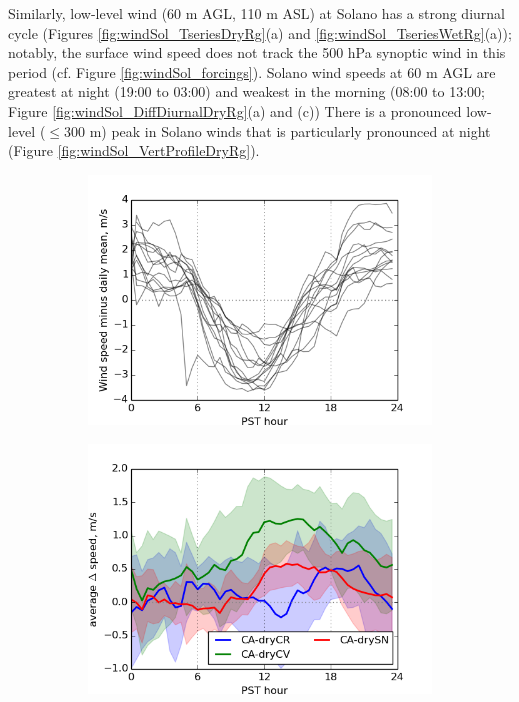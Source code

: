 Similarly, low-level wind (60 m AGL, 110 m ASL) at Solano has a strong diurnal cycle (Figures \ref{fig:windSol_TseriesDryRg}(a) and \ref{fig:windSol_TseriesWetRg}(a)); notably, the surface wind speed does not track the 500 hPa synoptic wind in this period (cf. Figure \ref{fig:windSol_forcings}).  Solano wind speeds at 60 m AGL are greatest at night (19:00 to 03:00) and weakest in the morning (08:00 to 13:00; Figure \ref{fig:windSol_DiffDiurnalDryRg}(a) and (c))  There is a pronounced low-level ($\le$300 m) peak in Solano winds that is particularly pronounced at night (Figure \ref{fig:windSol_VertProfileDryRg}).

\begin{figure}[here]
\begin{subfigure}{0.5\textwidth}
\includegraphics[width=1\textwidth]{ch3-wind/img/solano_controlwind_minusmean_CA0pt25_d02_level0.png}
\caption{}
\end{subfigure}
\begin{subfigure}{0.5\textwidth}
\includegraphics[width=1\textwidth]{ch3-wind/img/solano_diurnalwind_dry_regions_d02_level0.png}

\end{subfigure}
\end{figure}
